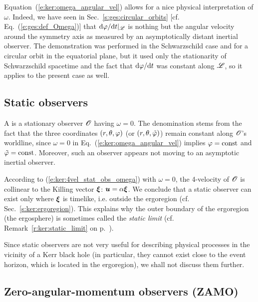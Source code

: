Equation~(\ref{e:ker:omega_angular_vel}) allows for a nice physical interpretation of
$\omega$. Indeed, we have seen in Sec.~\ref{s:ges:circular_orbits} [cf. Eq.~(\ref{e:ges:def_Omega})]
that $\mathrm{d}\varphi/\mathrm{d} t |_{\mathscr{L}}$ is nothing
but the angular velocity around the symmetry axis as measured by an asymptotically distant inertial observer.
The demonstration was performed in the Schwarzschild case and for a circular orbit in the equatorial plane, but
it used only the stationarity of Schwarzschild spacetime and the fact that ${\mathrm{d}\varphi}/{\mathrm{d} t}$ was constant
along $\mathscr{L}$, so it applies to the present case as well.


\subsection{Static observers} \label{s:ker:static_obs}

A 
is a stationary observer $\mathscr{O}$ having $\omega = 0$.
The denomination stems from the fact that the three coordinates $(r,\theta,\varphi)$
(or $(r,\theta,{\tilde\varphi})$)
remain constant along $\mathscr{O}$'s worldline, since $\omega = 0$ in Eq.~(\ref{e:ker:omega_angular_vel})
implies $\varphi = \mathrm{const}$ and ${\tilde\varphi} = \mathrm{const}$. Moreover, such an
observer appears not moving to an asymptotic inertial observer.

According to (\ref{e:ker:4vel_stat_obs_omega}) with $\omega=0$, the 4-velocity of $\mathscr{O}$ is collinear to the Killing vector $\bm{\xi}$: $\bm{u} = \alpha \bm{\xi}$. We conclude that a static
observer can exist only where $\bm{\xi}$ is timelike, i.e. outside the ergoregion (cf. Sec.~\ref{s:ker:ergoregion}). This explains why the outer boundary of the ergoregion
(the ergosphere) is sometimes called the \emph{static limit} (cf. Remark~\ref{r:ker:static_limit} on p.~\pageref{r:ker:static_limit}).

Since static observers are not very useful for describing physical processes
in the vicinity of a Kerr black hole (in particular, they cannot exist
close to the event horizon, which is located in the ergoregion), we shall not
discuss them further.


\subsection{Zero-angular-momentum observers (ZAMO)} \label{s:ker:ZAMO}

